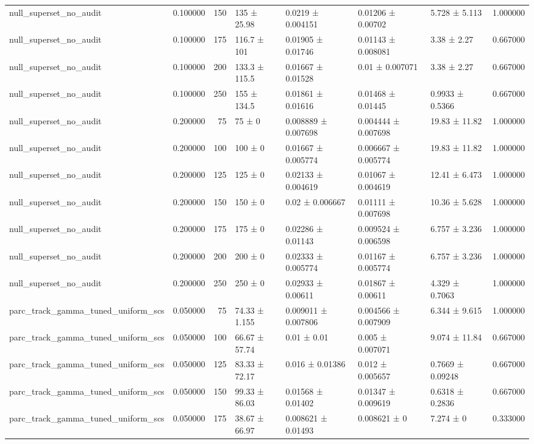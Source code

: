 \begin{tabular}{lrrllllr}
null_superset_no_audit & 0.100000 & 150 & 135 ± 25.98 & 0.0219 ± 0.004151 & 0.01206 ± 0.00702 & 5.728 ± 5.113 & 1.000000 \\
null_superset_no_audit & 0.100000 & 175 & 116.7 ± 101 & 0.01905 ± 0.01746 & 0.01143 ± 0.008081 & 3.38 ± 2.27 & 0.667000 \\
null_superset_no_audit & 0.100000 & 200 & 133.3 ± 115.5 & 0.01667 ± 0.01528 & 0.01 ± 0.007071 & 3.38 ± 2.27 & 0.667000 \\
null_superset_no_audit & 0.100000 & 250 & 155 ± 134.5 & 0.01861 ± 0.01616 & 0.01468 ± 0.01445 & 0.9933 ± 0.5366 & 0.667000 \\
null_superset_no_audit & 0.200000 & 75 & 75 ± 0 & 0.008889 ± 0.007698 & 0.004444 ± 0.007698 & 19.83 ± 11.82 & 1.000000 \\
null_superset_no_audit & 0.200000 & 100 & 100 ± 0 & 0.01667 ± 0.005774 & 0.006667 ± 0.005774 & 19.83 ± 11.82 & 1.000000 \\
null_superset_no_audit & 0.200000 & 125 & 125 ± 0 & 0.02133 ± 0.004619 & 0.01067 ± 0.004619 & 12.41 ± 6.473 & 1.000000 \\
null_superset_no_audit & 0.200000 & 150 & 150 ± 0 & 0.02 ± 0.006667 & 0.01111 ± 0.007698 & 10.36 ± 5.628 & 1.000000 \\
null_superset_no_audit & 0.200000 & 175 & 175 ± 0 & 0.02286 ± 0.01143 & 0.009524 ± 0.006598 & 6.757 ± 3.236 & 1.000000 \\
null_superset_no_audit & 0.200000 & 200 & 200 ± 0 & 0.02333 ± 0.005774 & 0.01167 ± 0.005774 & 6.757 ± 3.236 & 1.000000 \\
null_superset_no_audit & 0.200000 & 250 & 250 ± 0 & 0.02933 ± 0.00611 & 0.01867 ± 0.00611 & 4.329 ± 0.7063 & 1.000000 \\
parc_track_gamma_tuned_uniform_scs & 0.050000 & 75 & 74.33 ± 1.155 & 0.009011 ± 0.007806 & 0.004566 ± 0.007909 & 6.344 ± 9.615 & 1.000000 \\
parc_track_gamma_tuned_uniform_scs & 0.050000 & 100 & 66.67 ± 57.74 & 0.01 ± 0.01 & 0.005 ± 0.007071 & 9.074 ± 11.84 & 0.667000 \\
parc_track_gamma_tuned_uniform_scs & 0.050000 & 125 & 83.33 ± 72.17 & 0.016 ± 0.01386 & 0.012 ± 0.005657 & 0.7669 ± 0.09248 & 0.667000 \\
parc_track_gamma_tuned_uniform_scs & 0.050000 & 150 & 99.33 ± 86.03 & 0.01568 ± 0.01402 & 0.01347 ± 0.009619 & 0.6318 ± 0.2836 & 0.667000 \\
parc_track_gamma_tuned_uniform_scs & 0.050000 & 175 & 38.67 ± 66.97 & 0.008621 ± 0.01493 & 0.008621 ± 0 & 7.274 ± 0 & 0.333000 \\

\end{tabular}
